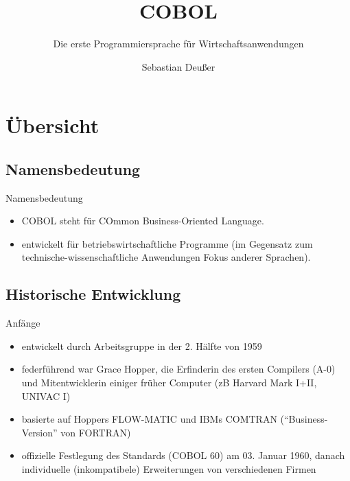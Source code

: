 \documentclass[handout]{beamer}
\title[COBOL-\"Uberblick]   %
{COBOL}
\subtitle
{Die erste Programmiersprache für Wirtschaftsanwendungen} %
\author %
{Sebastian Deußer}
\begin{document}
\begin{frame}
  \titlepage
\end{frame}





\section{Übersicht}

\subsection{Namensbedeutung}

\begin{frame}{Namensbedeutung}
	\begin{itemize}
		\item
			COBOL steht für COmmon Business-Oriented Language.
		\item
			entwickelt für betriebswirtschaftliche Programme (im Gegensatz zum technische-wissenschaftliche Anwendungen Fokus anderer Sprachen).
	\end{itemize}
\end{frame}

\subsection{Historische Entwicklung}

\begin{frame}{Anfänge}
	\begin{itemize}
		\item
			entwickelt durch Arbeitsgruppe in der 2. H\"alfte von 1959
		\item
			federführend war Grace Hopper, die Erfinderin des ersten Compilers (A-0) und Mitentwicklerin einiger fr\"uher Computer (zB Harvard Mark I+II, UNIVAC I)
		\item
			basierte auf Hoppers FLOW-MATIC und IBMs COMTRAN (``Business-Version'' von FORTRAN)
		\item
		offizielle Festlegung des Standards (COBOL 60) am 03. Januar 1960, danach individuelle (inkompatibele) Erweiterungen von verschiedenen Firmen
	\end{itemize}
\end{frame}
\end{document}
